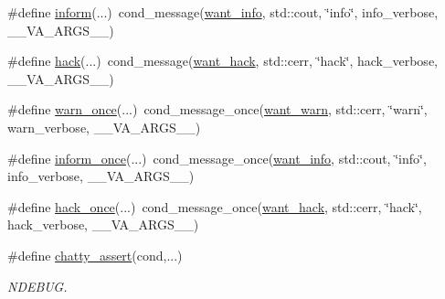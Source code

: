 \begin{DoxyCompactItemize}
\#define \hyperlink{base_2misc_8hh_ae7d790080fa18103d7582effff570b9e}{inform}(...)~cond\_\-message(\hyperlink{base_2misc_8hh_a3e07912efc18048822c757ea8a863933}{want\_\-info}, std::cout, \char`\"{}info\char`\"{}, info\_\-verbose, \_\-\_\-VA\_\-ARGS\_\-\_\-)
\item 
\#define \hyperlink{base_2misc_8hh_a3ac67e8755a9cc9c3bf9e84e0f221458}{hack}(...)~cond\_\-message(\hyperlink{base_2misc_8hh_a09cfe40e5e0aa49eac5976147c13d7ee}{want\_\-hack}, std::cerr, \char`\"{}hack\char`\"{}, hack\_\-verbose, \_\-\_\-VA\_\-ARGS\_\-\_\-)
\item 
\#define \hyperlink{base_2misc_8hh_abb243c15dfbeedf4ae64aa213f4f18c7}{warn\_\-once}(...)~cond\_\-message\_\-once(\hyperlink{base_2misc_8hh_a77f6725c0d2349664643937fe56cafc0}{want\_\-warn}, std::cerr, \char`\"{}warn\char`\"{}, warn\_\-verbose, \_\-\_\-VA\_\-ARGS\_\-\_\-)
\item 
\#define \hyperlink{base_2misc_8hh_af8d79216c5f11e879df0d333f7400b12}{inform\_\-once}(...)~cond\_\-message\_\-once(\hyperlink{base_2misc_8hh_a3e07912efc18048822c757ea8a863933}{want\_\-info}, std::cout, \char`\"{}info\char`\"{}, info\_\-verbose, \_\-\_\-VA\_\-ARGS\_\-\_\-)
\item 
\#define \hyperlink{base_2misc_8hh_ae2881bab26c1d2bf4a411f8b1fb7e574}{hack\_\-once}(...)~cond\_\-message\_\-once(\hyperlink{base_2misc_8hh_a09cfe40e5e0aa49eac5976147c13d7ee}{want\_\-hack}, std::cerr, \char`\"{}hack\char`\"{}, hack\_\-verbose, \_\-\_\-VA\_\-ARGS\_\-\_\-)
\item 
\#define \hyperlink{base_2misc_8hh_a2a71fb8492c58a8b76d5cbe29cb4d561}{chatty\_\-assert}(cond,...)
\begin{DoxyCompactList}\small\item\em NDEBUG. \item\end{DoxyCompactList}\end{DoxyCompactItemize}
